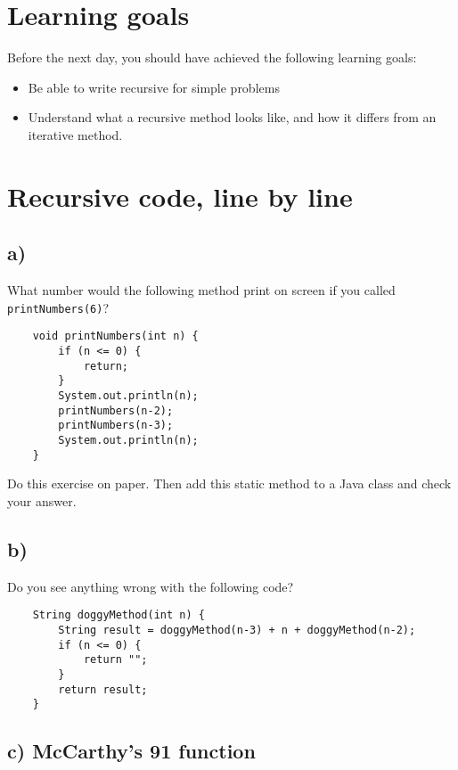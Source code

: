 \documentclass{article}
\begin{document}
\section*{Learning goals}
\label{sec:learning-goals}

Before the next day, you should have achieved the following learning
goals: 

\begin{itemize}
\item Be able to write recursive for simple problems
\item Understand what a recursive method looks like, and how it
  differs from an iterative method. 
\end{itemize}

\section{Recursive code, line by line}
\label{sec:read-recurs-code}

\subsection*{a)}

What number would the following method print on screen if you called
\verb+printNumbers(6)+?

\begin{verbatim}
    void printNumbers(int n) {
        if (n <= 0) {
            return;
        }
        System.out.println(n);
        printNumbers(n-2);
        printNumbers(n-3);
        System.out.println(n);
    }
\end{verbatim}

Do this exercise on paper. Then add this static method to a Java class
and check your answer. 

\subsection*{b)}
\label{sec:b-1}

Do you see anything wrong with the following code?

\begin{verbatim}
    String doggyMethod(int n) {
        String result = doggyMethod(n-3) + n + doggyMethod(n-2);
        if (n <= 0) {
            return "";
        }
        return result;
    }
\end{verbatim}

\subsection*{c) McCarthy's 91 function}
\label{sec:c}
\end{document}
